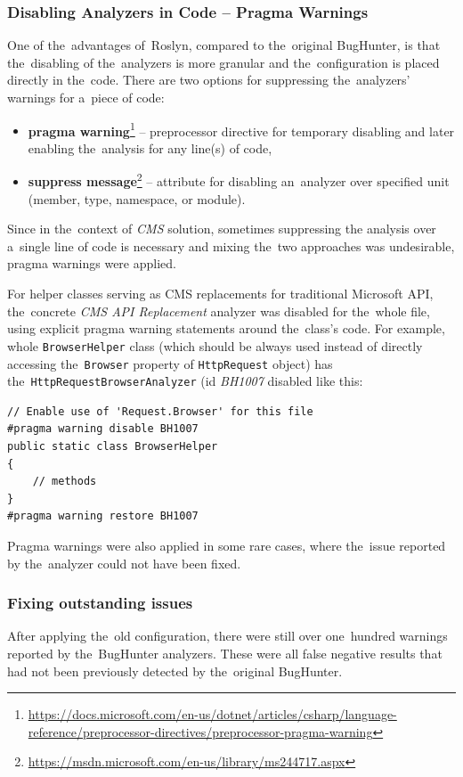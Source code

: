 \documentclass[
  digital, %
  table,   %
  lof,     %
  lot,     %
  oneside,
]{fithesis3}
\begin{document}
\subsubsection{\textbf{Disabling Analyzers in Code -- Pragma Warnings}}
One of the~advantages of~Roslyn, compared to the~original BugHunter, is that the~disabling of the~analyzers is more granular and the~configuration is placed directly in the~code. There are two options for suppressing the~analyzers' warnings for a~piece of code:
\begin{itemize}
  \item \textbf{pragma warning}\footnote{\url{https://docs.microsoft.com/en-us/dotnet/articles/csharp/language-reference/preprocessor-directives/preprocessor-pragma-warning}} -- preprocessor directive for temporary disabling and later enabling the~analysis for any line(s) of code,
  \item \textbf{suppress message}\footnote{\url{https://msdn.microsoft.com/en-us/library/ms244717.aspx}} -- attribute for disabling an~analyzer over specified unit (member, type, namespace, or module).
\end{itemize}

Since in the~context of \textit{CMS} solution, sometimes suppressing the analysis over a~single line of code is necessary and mixing the~two approaches was undesirable, pragma warnings were applied.

For helper classes serving as CMS replacements for traditional Microsoft API, the~concrete \textit{CMS API Replacement} analyzer was disabled for the~whole file, using explicit pragma warning statements around the~class's code. For example, whole \texttt{BrowserHelper} class (which should be always used instead of directly accessing the~\texttt{Browser} property of \texttt{HttpRequest} object) has the~\texttt{HttpRequestBrowserAnalyzer} (id \textit{BH1007} disabled like this:

\begin{verbatim}
// Enable use of 'Request.Browser' for this file
#pragma warning disable BH1007 
public static class BrowserHelper
{
    // methods
}
#pragma warning restore BH1007
\end{verbatim}

Pragma warnings were also applied in some rare cases, where the~issue reported by the~analyzer could not have been fixed.

\subsubsection{\textbf{Fixing outstanding issues}}
After applying the~old configuration, there were still over one~hundred warnings reported by the~BugHunter analyzers. These were all false negative results that had not been previously detected by the~original BugHunter. 
\end{document}
